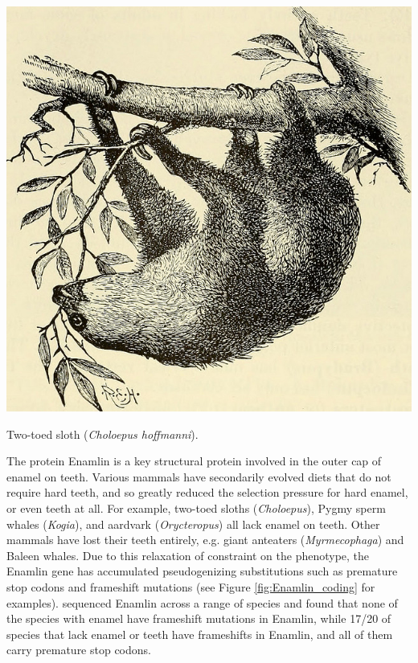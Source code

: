 \begin{marginfigure}
\begin{center}
\includegraphics[width=\textwidth]{illustration_images/Genetic_drift/sloth/20423856040_6e4360df9c_z.jpg}   %
\end{center}
\caption{Two-toed sloth ({\it Choloepus hoffmanni}).  } \label{fig:sloth}
\end{marginfigure}

The protein Enamlin is a key structural protein involved in the outer cap of enamel on teeth. Various mammals have secondarily evolved diets that do not require hard teeth, and so greatly reduced the selection pressure for hard enamel, or even teeth at all. For example, two-toed sloths ({\it Choloepus}), Pygmy sperm whales ({\it Kogia}), and aardvark ({\it Orycteropus}) all lack  enamel on teeth.
Other mammals have lost their teeth entirely, e.g. giant anteaters ({\it Myrmecophaga}) and Baleen whales. Due to this relaxation of constraint on the phenotype, the Enamlin gene has accumulated pseudogenizing substitutions such as premature stop codons and frameshift mutations (see Figure \ref{fig:Enamlin_coding}
for examples).  \citet{Meredith:09} sequenced Enamlin across a
range of species and found that none of the species with enamel have frameshift
mutations in Enamlin, while 17/20 of species that lack enamel or teeth have
frameshifts in Enamlin, and all of them carry premature stop codons. 

